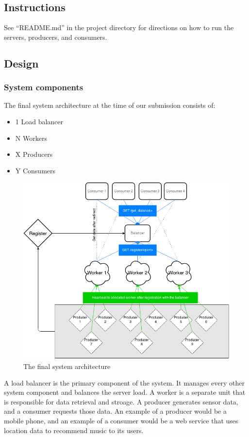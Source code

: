 \documentclass{sigchi}
\begin{document}
\subsection{Instructions}

See \enquote{README.md} in the project directory for directions on how to run the servers, producers, and consumers.

\subsection{Design}

\subsubsection{System components}

The final system architecture at the time of our submission consists of:

\begin{itemize}
  \item 1 Load balancer
  \item N Workers
  \item X Producers
  \item Y Consumers
\end{itemize}

\begin{figure}[!h]
\centering
\includegraphics[width=0.9\columnwidth]{img/main}
\caption{The final system architecture}
\label{fig:main}
\end{figure}

A load balancer is the primary component of the system. It manages every other system component and balances the server load. A worker is a separate unit that is responsible for data retrieval and stroage. A producer generates sensor data, and a consumer requests those data. An example of a producer would be a mobile phone, and an example of a consumer would be a web service that uses location data to recommend music to its users.
\end{document}
